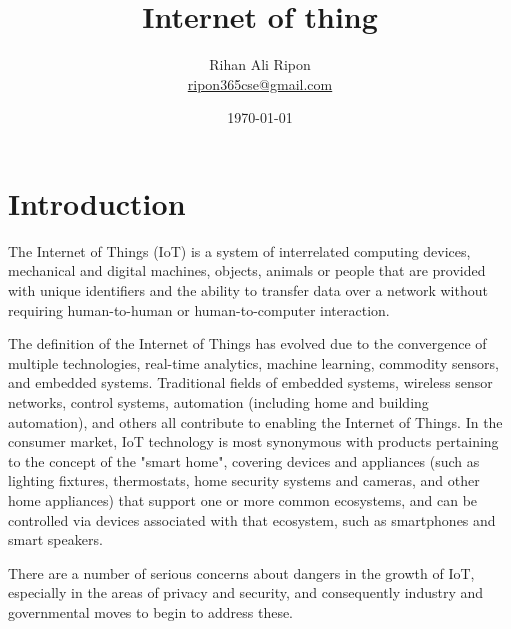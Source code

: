\documentclass[oneside, 11 pt]{report}
\title{Internet of thing}
\date{\today}
\author{Rihan Ali Ripon \\ \href{mailto:ripon365cse@gmail.com}{ripon365cse@gmail.com}}
\begin{document}
\maketitle


\section*{Introduction}
The Internet of Things (IoT) is a system of interrelated computing devices, mechanical and digital machines, objects, animals or people that are provided with unique identifiers and the ability to transfer data over a network without requiring human-to-human or human-to-computer interaction.

The definition of the Internet of Things has evolved due to the convergence of multiple technologies, real-time analytics, machine learning, commodity sensors, and embedded systems. Traditional fields of embedded systems, wireless sensor networks, control systems, automation (including home and building automation), and others all contribute to enabling the Internet of Things. In the consumer market, IoT technology is most synonymous with products pertaining to the concept of the "smart home", covering devices and appliances (such as lighting fixtures, thermostats, home security systems and cameras, and other home appliances) that support one or more common ecosystems, and can be controlled via devices associated with that ecosystem, such as smartphones and smart speakers.

There are a number of serious concerns about dangers in the growth of IoT, especially in the areas of privacy and security, and consequently industry and governmental moves to begin to address these.

\tableofcontents
\end{document}
